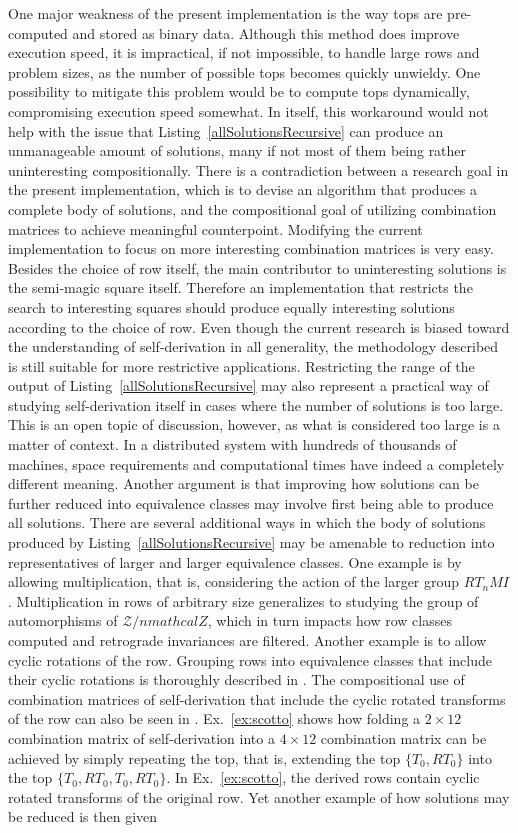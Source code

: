 One major weakness of the present implementation is the way tops are pre-computed and stored as binary data. Although this method does improve execution speed, it is impractical, if not impossible, to handle large rows and problem sizes, as the number of possible tops becomes quickly unwieldy. One possibility to mitigate this problem would be to compute tops dynamically, compromising execution speed somewhat. In itself, this workaround would not help with the issue that Listing~\ref{allSolutionsRecursive} can produce an unmanageable amount of solutions, many if not most of them being rather uninteresting compositionally. There is a contradiction between a research goal in the present implementation, which is to devise an algorithm that produces a complete body of solutions, and the compositional goal of utilizing combination matrices to achieve meaningful counterpoint. Modifying the current implementation to focus on more interesting combination matrices is very easy. Besides the choice of row itself, the main contributor to uninteresting solutions is the semi-magic square itself. Therefore an implementation that restricts the search to interesting squares should produce equally interesting solutions according to the choice of row. Even though the current research is biased toward the understanding of self-derivation in all generality, the methodology described is still suitable for more restrictive applications. Restricting the range of the output of Listing~\ref{allSolutionsRecursive} may also represent a practical way of studying self-derivation itself in cases where the number of solutions is too large. This is an open topic of discussion, however, as what is considered too large is a matter of context. In a distributed system with hundreds of thousands of machines, space requirements and computational times have indeed a completely different meaning. Another argument is that improving how solutions can be further reduced into equivalence classes may involve first being able to produce all solutions. There are several additional ways in which the body of solutions produced by Listing~\ref{allSolutionsRecursive} may be amenable to reduction into representatives of larger and larger equivalence classes. One example is by allowing multiplication, that is, considering the action of the larger group $RT_nMI$. Multiplication in rows of arbitrary size generalizes to studying the group of automorphisms of $\mathcal{Z} / n mathcal{Z}$, which in turn impacts how row classes computed and retrograde invariances are filtered. Another example is to allow cyclic rotations of the row. Grouping rows into equivalence classes that include their cyclic rotations is thoroughly described in \cite{FripertingerLackner2015}. The compositional use of combination matrices of self-derivation that include the cyclic rotated transforms of the row can also be seen in \cite{Scotto2000}. Ex.~\ref{ex:scotto} shows how folding a $2 \times 12$ combination matrix of self-derivation into a $4 \times 12$ combination matrix can be achieved by simply repeating the top, that is, extending the top $\{T_0, RT_0\}$ into the top $\{T_0, RT_0, T_0, RT_0\}$. In Ex.~\ref{ex:scotto}, the derived rows contain cyclic rotated transforms of the original row. Yet another example of how solutions may be reduced is then given 